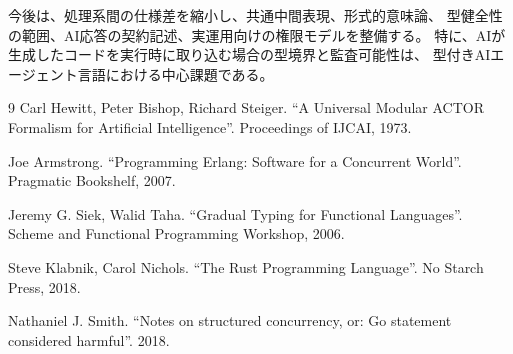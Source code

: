 \documentclass[11pt,a4paper,uplatex,dvipdfmx]{jsarticle}
\begin{document}
今後は、処理系間の仕様差を縮小し、共通中間表現、形式的意味論、
型健全性の範囲、AI応答の契約記述、実運用向けの権限モデルを整備する。
特に、AIが生成したコードを実行時に取り込む場合の型境界と監査可能性は、
型付きAIエージェント言語における中心課題である。

\begin{thebibliography}{9}
Carl Hewitt, Peter Bishop, Richard Steiger.
``A Universal Modular ACTOR Formalism for Artificial Intelligence''.
Proceedings of IJCAI, 1973.

Joe Armstrong.
``Programming Erlang: Software for a Concurrent World''.
Pragmatic Bookshelf, 2007.

Jeremy G. Siek, Walid Taha.
``Gradual Typing for Functional Languages''.
Scheme and Functional Programming Workshop, 2006.

Steve Klabnik, Carol Nichols.
``The Rust Programming Language''.
No Starch Press, 2018.

Nathaniel J. Smith.
``Notes on structured concurrency, or: Go statement considered harmful''.
2018.
\end{thebibliography}
\end{document}
